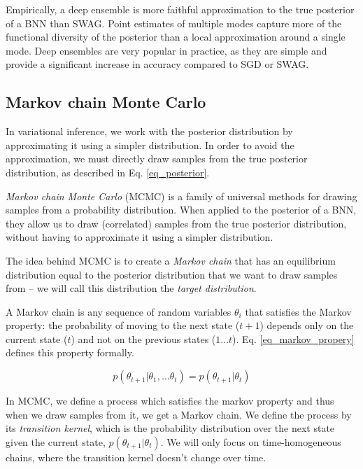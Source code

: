 \documentclass[12pt]{article}
\begin{document}
{Empirically, a deep ensemble is more faithful approximation to the true posterior of a BNN than SWAG. \cite{bnn_posterior} Point estimates of multiple modes capture more of the functional diversity of the posterior than a local approximation around a single mode. Deep ensembles are very popular in practice, as they are simple and provide a significant increase in accuracy compared to SGD or SWAG. \cite{multiswag}

\subsection{Markov chain Monte Carlo}
\label{sec_mcmc}

In variational inference, we work with the posterior distribution by approximating it using a simpler distribution. In order to avoid the approximation, we must directly draw samples from the true posterior distribution, as described in Eq. \ref{eq_posterior}.

\textit{Markov chain Monte Carlo} (MCMC) is a family of universal methods for drawing samples from a probability distribution. When applied to the posterior of a BNN, they allow us to draw (correlated) samples from the true posterior distribution, without having to approximate it using a simpler distribution.

The idea behind MCMC is to create a \textit{Markov chain} that has an equilibrium distribution equal to the posterior distribution that we want to draw samples from -- we will call this distribution the \textit{target distribution}.

A Markov chain is any sequence of random variables $\theta_i$ that satisfies the Markov property: the probability of moving to the next state ($t+1$) depends only on the current state ($t$) and not on the previous states ($1 \ldots t$). Eq. \ref{eq_markov_propery} defines this property formally.

\begin{equation}
p(\theta_{t+1}|\theta_1,\ldots \theta_t)=p(\theta_{t+1}|\theta_t)
\label{eq_markov_propery}
\end{equation}

In MCMC, we define a process which satisfies the markov property and thus when we draw samples from it, we get a Markov chain. We define the process by its \textit{transition kernel}, which is the probability distribution over the next state given the current state, $p(\theta_{t+1}|\theta_t)$. We will only focus on time-homogeneous chains, where the transition kernel doesn't change over time.

}
\end{document}
